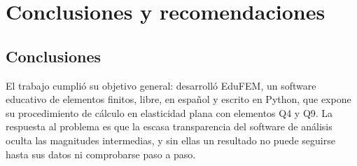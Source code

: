 \chapter*{Conclusiones y recomendaciones}

\begingroup
\renewcommand{\floatpagefraction}{0.85}
\renewcommand{\topfraction}{0.85}
\renewcommand{\textfraction}{0.10}
\setcounter{figure}{0}
\setcounter{table}{0}
\renewcommand{\thefigure}{CR.\arabic{figure}}
\renewcommand{\thetable}{CR.\arabic{table}}
\renewcommand{\theHfigure}{CR.\arabic{figure}}
\renewcommand{\theHtable}{CR.\arabic{table}}

\section*{Conclusiones}

El trabajo cumplió su objetivo general: desarrolló EduFEM, un software educativo de elementos finitos, libre, en español y escrito en Python, que expone su procedimiento de cálculo en elasticidad plana con elementos Q4 y Q9. La respuesta al problema es que la escasa transparencia del software de análisis oculta las magnitudes intermedias, y sin ellas un resultado no puede seguirse hasta sus datos ni comprobarse paso a paso.

